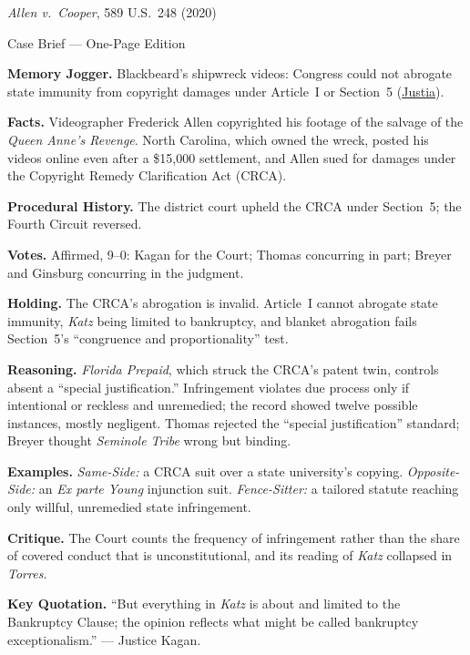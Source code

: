 \documentclass[12pt]{article}
\begin{document}
\begin{center}
{\Large \textit{Allen v.\ Cooper}, 589 U.S.\ 248 (2020)\par}
\vspace{0.3em}
{\normalsize Case Brief --- One-Page Edition\par}
\end{center}

\textbf{Memory Jogger.} Blackbeard's shipwreck videos: Congress could not abrogate state immunity from copyright damages under Article~I or Section~5 (\href{https://supreme.justia.com/cases/federal/us/589/18-877/}{Justia}).

\textbf{Facts.} Videographer Frederick Allen copyrighted his footage of the salvage of the \textit{Queen Anne's Revenge}. North Carolina, which owned the wreck, posted his videos online even after a \$15,000 settlement, and Allen sued for damages under the Copyright Remedy Clarification Act (CRCA).

\textbf{Procedural History.} The district court upheld the CRCA under Section~5; the Fourth Circuit reversed.

\textbf{Votes.} Affirmed, 9--0: Kagan for the Court; Thomas concurring in part; Breyer and Ginsburg concurring in the judgment.

\textbf{Holding.} The CRCA's abrogation is invalid. Article~I cannot abrogate state immunity, \textit{Katz} being limited to bankruptcy, and blanket abrogation fails Section~5's ``congruence and proportionality'' test.

\textbf{Reasoning.} \textit{Florida Prepaid}, which struck the CRCA's patent twin, controls absent a ``special justification.'' Infringement violates due process only if intentional or reckless and unremedied; the record showed twelve possible instances, mostly negligent. Thomas rejected the ``special justification'' standard; Breyer thought \textit{Seminole Tribe} wrong but binding.

\textbf{Examples.} \emph{Same-Side:} a CRCA suit over a state university's copying. \emph{Opposite-Side:} an \textit{Ex parte Young} injunction suit. \emph{Fence-Sitter:} a tailored statute reaching only willful, unremedied state infringement.

\textbf{Critique.} The Court counts the frequency of infringement rather than the share of covered conduct that is unconstitutional, and its reading of \textit{Katz} collapsed in \textit{Torres}.

\textbf{Key Quotation.} ``But everything in \textit{Katz} is about and limited to the Bankruptcy Clause; the opinion reflects what might be called bankruptcy exceptionalism.'' --- Justice Kagan.
\end{document}
